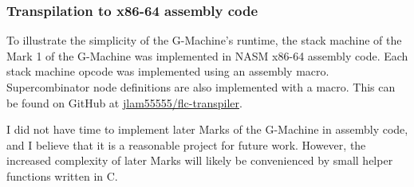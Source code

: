 \subsubsection{Transpilation to x86-64 assembly code}
\label{sec:gm-transpile-x86}

To illustrate the simplicity of the G-Machine's runtime, the stack machine of the Mark 1 of the G-Machine was implemented in NASM x86-64 assembly code. Each stack machine opcode was implemented using an assembly macro. Supercombinator node definitions are also implemented with a macro. This can be found on GitHub at \href{https://github.com/jlam55555/flc-transpiler}{jlam55555/flc-transpiler}.

I did not have time to implement later Marks of the G-Machine in assembly code, and I believe that it is a reasonable project for future work. However, the increased complexity of later Marks will likely be convenienced by small helper functions written in C.

